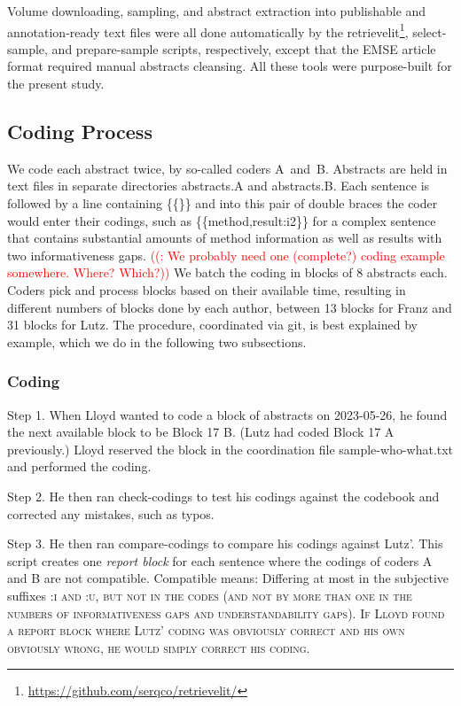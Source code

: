 \documentclass[10pt,journal,compsoc]{IEEEtran}
\newcommand{\Cb}[1]{\bgroup\scshape #1\egroup}  %
\newcommand{\Prg}[1]{\bgroup\ttfamily #1\egroup}  %
\newcounter{todonumber}
\newcommand{\Todo}[1]{\stepcounter{todonumber}\textcolor{red}{\sffamily ((\arabic{todonumber}: #1))}}
\begin{document}
Volume downloading, sampling, and abstract extraction into publishable
and annotation-ready text files were all done automatically by the
retrievelit\footnote{\url{https://github.com/serqco/retrievelit/}},
select-sample, and prepare-sample scripts, respectively, except
that the EMSE article format required manual abstracts cleansing.
All these tools were purpose-built for the present study.


\subsection{Coding Process}\label{meth_coding}

We code each abstract twice, by so-called coders A~and~B.
Abstracts are held in text files in separate directories \Prg{abstracts.A} and \Prg{abstracts.B}.
Each sentence is followed by a line containing \Prg{\{\{\}\}} and into this pair of
double braces the coder would enter their codings,
such as \Prg{\{\{method,result:i2\}\}} for a complex sentence that contains substantial
amounts of method information as well as results with two informativeness gaps.
\Todo{We probably need one (complete?) coding example somewhere. Where? Which?}
We batch the coding in blocks of 8 abstracts each.
Coders pick and process blocks based on their available time, resulting in different numbers of blocks
done by each author, between 13 blocks for Franz and 31 blocks for Lutz. 
The procedure, coordinated via git, is best explained by example,
which we do in the following two subsections.


\subsubsection{Coding}

\indent Step 1. When Lloyd wanted to code a block of abstracts on 2023-05-26,
he found the next available block to be Block 17 B.
(Lutz had coded Block 17 A previously.)
Lloyd reserved the block in the coordination file \Prg{sample-who-what.txt}
and performed the coding.

Step 2. He then ran \Prg{check-codings} to test his codings
against the codebook and corrected any mistakes, such as typos.

Step 3. He then ran \Prg{compare-codings} to compare his codings against Lutz'.
This script creates one \emph{report block} for each sentence where the codings
of coders A and B are not compatible.
Compatible means: Differing at most in the subjective suffixes \Cb{:i} and \Cb{:u}, but not in the codes
(and not by more than one in the numbers of informativeness gaps and understandability gaps).
If Lloyd found a report block where Lutz' coding was obviously correct and his own
obviously wrong, he would simply correct his coding.
\end{document}
